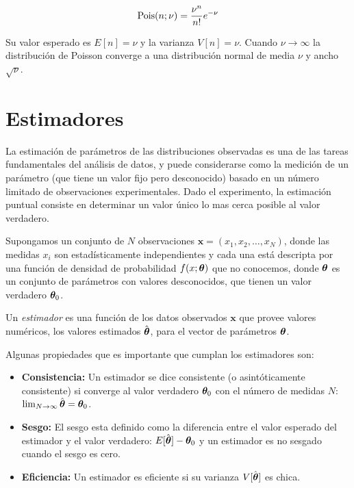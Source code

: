 \begin{equation}
  \operatorname{Pois}(n;\nu) = \frac{\nu^n}{n!} e^{-\nu}
\end{equation}

Su valor esperado es $E[n] = \nu$ y la varianza $V[n] = \nu$.
Cuando $\nu \to \infty$ la distribución de Poisson converge a una distribución
normal de media $\nu$ y ancho $\sqrt{\nu}$.


\section{Estimadores}

La estimación de parámetros de las distribuciones observadas es una de las
tareas fundamentales del análisis de datos, y puede considerarse como la
medición de un parámetro (que tiene un valor fijo pero desconocido) basado en un
número limitado de observaciones experimentales. Dado el experimento, la
estimación puntual consiste en determinar un valor único lo mas cerca posible al
valor verdadero.%

Supongamos un conjunto de $N$ observaciones $\bm{x} = (x_1, x_2, \ldots, x_N)$,
donde las medidas $x_i$ son estadísticamente independientes y cada una está
descripta por una función de densidad de probabilidad $f(x;\bm{\theta})$ que no
conocemos, donde $\bm{\theta}$ es un conjunto de parámetros con valores
desconocidos, que tienen un valor verdadero $\bm{\theta}_0$.


Un \emph{estimador} es una función de los datos observados $\bm{x}$ que provee
valores numéricos, los valores estimados $\hat{\bm{\theta}}$, para el vector de
parámetros $\bm{\theta}$.

Algunas propiedades que es importante que cumplan los estimadores son:

\begin{itemize}\itemsep0.2cm\parskip0.2cm
\item {\bf Consistencia:} Un estimador se dice consistente (o asintóticamente
  consistente) si converge al valor verdadero $\bm{\theta}_{0}$ con el número de
  medidas $N$: $\lim_{N \rightarrow \infty} \hat{\bm{\theta}} = \bm{\theta}_0$.

\item {\bf Sesgo:} El sesgo esta definido como la diferencia entre el valor
  esperado del estimador y el valor verdadero: $E[\hat{\bm{\theta}}] - \bm{\theta}_0$ y
  un estimador es no sesgado cuando el sesgo es cero.

\item {\bf Eficiencia:} Un estimador es eficiente si su varianza
  $V[\hat{\bm{\theta}}]$ es chica.
\end{itemize}

